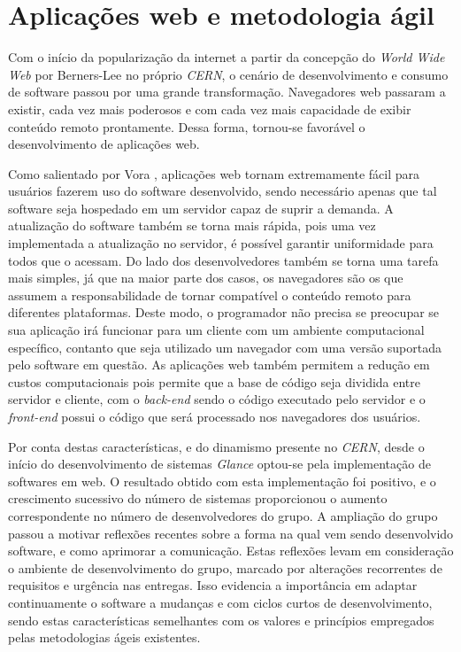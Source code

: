 \section{Aplicações web e metodologia ágil}
Com o início da popularização da internet a partir da concepção do \emph{World Wide Web} por Berners-Lee \cite{Berners-Lee} no próprio \emph{CERN}, o cenário de desenvolvimento e consumo de software passou por uma grande transformação. Navegadores web passaram a existir, cada vez mais poderosos e com cada vez mais capacidade de exibir conteúdo remoto prontamente. Dessa forma, tornou-se favorável o desenvolvimento de aplicações web.

Como salientado por Vora \cite{vora}, aplicações web tornam extremamente fácil para usuários fazerem uso do software desenvolvido, sendo necessário apenas que tal software seja hospedado em um servidor capaz de suprir a demanda. A atualização do software também se torna mais rápida, pois uma vez implementada a atualização no servidor, é possível garantir uniformidade para todos que o acessam. Do lado dos desenvolvedores também se torna uma tarefa mais simples, já que na maior parte dos casos, os navegadores são os que assumem a responsabilidade de tornar compatível o conteúdo remoto para diferentes plataformas. Deste modo, o programador não precisa se preocupar se sua aplicação irá funcionar para um cliente com um ambiente computacional específico, contanto que seja utilizado um navegador com uma versão suportada pelo software em questão. As aplicações web também permitem a redução em custos computacionais pois permite que a base de código seja dividida entre servidor e cliente, com o \emph{back-end} sendo o código executado pelo servidor e o \emph{front-end} possui o código que será processado nos navegadores dos usuários.

Por conta destas características, e do dinamismo presente no \emph{CERN}, desde o início do desenvolvimento de sistemas \emph{Glance} optou-se pela implementação de softwares em web. O resultado obtido com esta implementação foi positivo, e o crescimento sucessivo do número de sistemas proporcionou o aumento correspondente no número de desenvolvedores do grupo. A ampliação do grupo passou a motivar reflexões recentes sobre a forma na qual vem sendo desenvolvido software, e como aprimorar a comunicação. Estas reflexões levam em consideração o ambiente de desenvolvimento do grupo, marcado por alterações recorrentes de requisitos e urgência nas entregas. Isso evidencia a importância em adaptar continuamente o software a mudanças e com ciclos curtos de desenvolvimento, sendo estas características semelhantes com os valores e princípios empregados pelas metodologias ágeis existentes.

